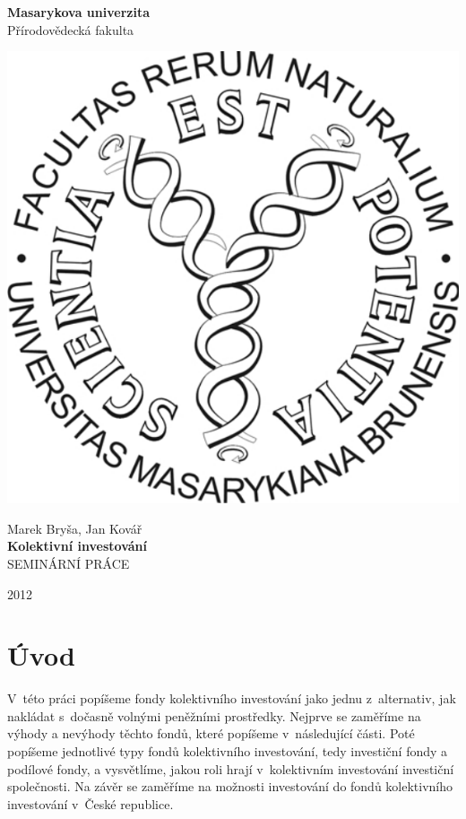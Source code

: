 \documentclass[12pt,a4paper]{article}
\begin{document}
\thispagestyle{empty}
\vfill
\begin{center}
{\Large \bf Masarykova univerzita\\[1ex]}
{\large Přírodovědecká fakulta}
\end{center}
\vfill
\begin{center}
\includegraphics[scale=0.7]{prf_logo.pdf}
\end{center}
\begin{center}
\vfill

Marek Bryša, Jan Kovář\\[3em]
{\LARGE \bf Kolektivní investování}\\[1em]
SEMINÁRNÍ PRÁCE\\
\vfill

{2012}
\end{center}

\setcounter{page}{0}
\newpage

\tableofcontents
\newpage

\section*{Úvod}

V~této práci popíšeme fondy kolektivního investování jako jednu z~alternativ, jak nakládat s~dočasně volnými peněžními prostředky. Nejprve se zaměříme na výhody a nevýhody těchto fondů, které popíšeme v~následující části. Poté popíšeme jednotlivé typy fondů kolektivního investování, tedy investiční fondy a podílové fondy, a vysvětlíme, jakou roli hrají v~kolektivním investování investiční společnosti. Na závěr se zaměříme na možnosti investování do fondů kolektivního investování v~České republice.
\end{document}
